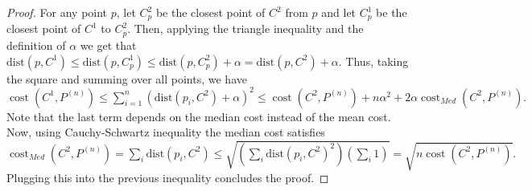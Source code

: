 \documentclass[a4paper,11pt,oneside,english,onecolumn]{article}
\theoremstyle{definition}
\newcommand{\dist}[0]{\ensuremath{\mathrm{dist}}}
\DeclareMathOperator{\cost}{cost}
\begin{document}
\begin{proof}
For any point $p$, let $C^2_p$ be the closest point of $C^2$ from $p$ and let $C^1_p$ be the closest point of $C^1$ to $C^2_p$. Then, applying the triangle inequality and the definition of $\alpha$ we get that
$\dist(p, C^1) \leq \dist(p, C^1_p) \leq \dist(p, C^2_p) + \alpha = \dist(p, C^2) + \alpha.$ Thus, taking the square and summing over all points, we have
$\cost(C^1,P^{(n)}) \leq \sum_{i=1}^n \left( \dist(p_i, C^2) + \alpha \right)^2 \leq \cost(C^2,P^{(n)}) + n \alpha^2 + 2\alpha\cost_{Med}(C^2, P^{(n)}).$
Note that the last term depends on the median cost instead of the mean cost.
Now, using Cauchy-Schwartz inequality the median cost satisfies
$\cost_{Med}(C^2, P^{(n)}) = \sum_i \dist(p_i, C^2) \leq \sqrt{\left( \sum_i \dist(p_i, C^2)^2 \right) \left( \sum_i 1 \right)} = \sqrt{n \cost(C^2,P^{(n)})}.$ Plugging this into the previous inequality concludes the proof.
\end{proof}
\end{document}
